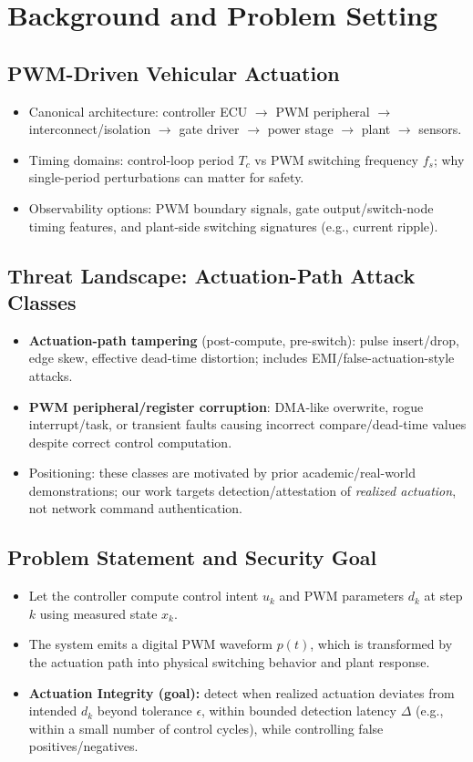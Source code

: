 \section{Background and Problem Setting}
\label{sec:preliminaries}
\subsection{PWM-Driven Vehicular Actuation}
\begin{itemize}
    \item Canonical architecture: controller ECU $\rightarrow$ PWM peripheral $\rightarrow$ interconnect/isolation $\rightarrow$ gate driver $\rightarrow$ power stage $\rightarrow$ plant $\rightarrow$ sensors.
    \item Timing domains: control-loop period $T_c$ vs PWM switching frequency $f_s$; why single-period perturbations can matter for safety.
    \item Observability options: PWM boundary signals, gate output/switch-node timing features, and plant-side switching signatures (e.g., current ripple).
\end{itemize}

\subsection{Threat Landscape: Actuation-Path Attack Classes}
\begin{itemize}
    \item \textbf{Actuation-path tampering} (post-compute, pre-switch): pulse insert/drop, edge skew, effective dead-time distortion; includes EMI/false-actuation-style attacks.
    \item \textbf{PWM peripheral/register corruption}: DMA-like overwrite, rogue interrupt/task, or transient faults causing incorrect compare/dead-time values despite correct control computation.
    \item Positioning: these classes are motivated by prior academic/real-world demonstrations; our work targets detection/attestation of \emph{realized actuation}, not network command authentication.
\end{itemize}

\subsection{Problem Statement and Security Goal}
\begin{itemize}
    \item Let the controller compute control intent $u_k$ and PWM parameters $d_k$ at step $k$ using measured state $x_k$.
    \item The system emits a digital PWM waveform $p(t)$, which is transformed by the actuation path into physical switching behavior and plant response.
    \item \textbf{Actuation Integrity (goal):} detect when realized actuation deviates from intended $d_k$ beyond tolerance $\epsilon$, within bounded detection latency $\Delta$ (e.g., within a small number of control cycles), while controlling false positives/negatives.
\end{itemize}

